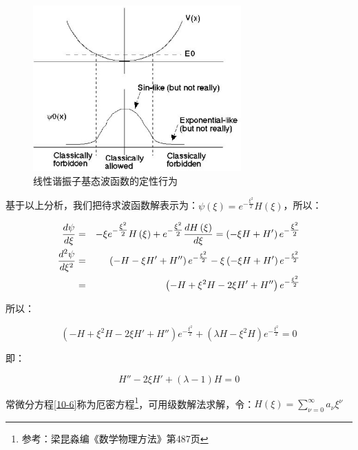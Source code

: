 \begin{figure}[h]
\begin{center}
\includegraphics[clip,width=8cm]{1DProblem/10-3.ps}
\caption{线性谐振子基态波函数的定性行为}
\end{center}
\end{figure}


基于以上分析，我们把待求波函数解表示为：$\psi (\xi ) = e^{ - \frac{{\xi ^2 }}{2}} H\left( \xi  \right)$，所以：

\begin{eqnarray*}
\frac{{d\psi }}{{d\xi }} & =  &  - \xi e^{ - {\textstyle{{\xi ^2 } \over 2}}} H\left( \xi  \right) + e^{ - {\textstyle{{\xi ^2 } \over 2}}} \frac{{dH\left( \xi  \right)}}{{d\xi }} = \left( { - \xi H + H'} \right)e^{ - {\textstyle{{\xi ^2 } \over 2}}} \\
 \frac{{d^2 \psi }}{{d\xi ^2 }} & = & \left( { - H - \xi H' + H''} \right)e^{ - \frac{{\xi ^2 }}{2}}  - \xi \left( { - \xi H + H'} \right)e^{ - \frac{{\xi ^2 }}{2}} \\
 {} & = & \left( { - H + \xi ^2 H - 2\xi H' + H''} \right)e^{ - \frac{{\xi ^2 }}{2}}
\end{eqnarray*}

所以：

\begin{equation*}
\left( { - H + \xi ^2 H - 2\xi H' + H''} \right)e^{ - \frac{{\xi ^2 }}{2}}  + \left( {\lambda H - \xi ^2 H} \right)e^{ - \frac{{\xi ^2 }}{2}}  = 0
\end{equation*}

即：

\begin{equation}\label{10-6}
H'' - 2\xi H' + \left( {\lambda  - 1} \right)H = 0
\end{equation}

常微分方程\ref{10-6}称为厄密方程\footnote{参考：梁昆淼编《数学物理方法》第487页}，可用级数解法求解，令：$H\left( \xi  \right) = \sum\limits_{\nu  = 0}^\infty  {a_\nu  \xi ^\nu  } $


